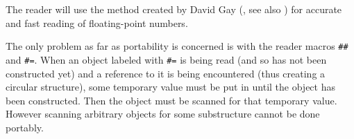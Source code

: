 The reader will use the method created by David Gay
(\cite{Gay90correctlyrounded}, see also
\cite{Clinger:1990:RFP:93542.93557}) for accurate and fast reading of
floating-point numbers.

The only problem as far as portability is concerned is with the reader
macros \texttt{\#\#} and \texttt{\#=}.  When an object labeled with
\texttt{\#=} is being read (and so has not been constructed yet) and a
reference to it is being encountered (thus creating a circular
structure), some temporary value must be put in until the object has
been constructed.  Then the object must be scanned for that temporary
value.  However scanning arbitrary objects for some substructure
cannot be done portably.



